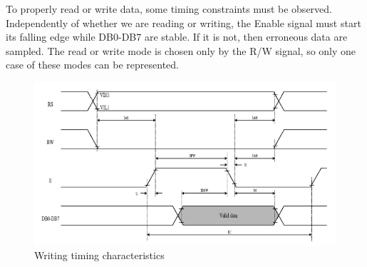 \documentclass[a4paper, 12pt]{article}
\begin{document}
To properly read or write data, some timing constraints must be observed. \\
Independently of whether we are reading or writing, the Enable signal must start its falling edge while DB$0$-DB$7$ are stable. If it is not, then erroneous data are sampled. 
The read or write mode is chosen only by the R/W signal, so only one case of these modes can be represented.
\begin{figure}[h]
    \includegraphics[width=12cm]{lcd_writing_data}
    \centering
    \caption{Writing timing characteristics}
\end{figure}
\end{document}
